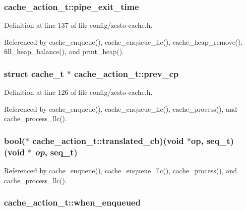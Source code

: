 \subsubsection[{pipe\_\-exit\_\-time}]{ {\bf cache\_\-action\_\-t::pipe\_\-exit\_\-time}}\label{structcache__action__t_0ad77a44844d710fb12f3eae1394da47}




Definition at line 137 of file config/zesto-cache.h.

Referenced by cache\_\-enqueue(), cache\_\-enqueue\_\-llc(), cache\_\-heap\_\-remove(), fill\_\-heap\_\-balance(), and print\_\-heap().
\subsubsection[{prev\_\-cp}]{\setlength{\rightskip}{0pt plus 5cm}struct {\bf cache\_\-t} $\ast$ {\bf cache\_\-action\_\-t::prev\_\-cp}\hspace{0.3cm}{\tt  [read]}}\label{structcache__action__t_beb9dad9b41f0f911d7b8f9a8a763810}




Definition at line 126 of file config/zesto-cache.h.

Referenced by cache\_\-enqueue(), cache\_\-enqueue\_\-llc(), cache\_\-process(), and cache\_\-process\_\-llc().
\subsubsection[{translated\_\-cb}]{\setlength{\rightskip}{0pt plus 5cm}bool($\ast$ {\bf cache\_\-action\_\-t::translated\_\-cb})(void $\ast${\bf op}, {\bf seq\_\-t}) (void $\ast$ {\em op}, \/  {\bf seq\_\-t})}\label{structcache__action__t_8db850e39ac4b8cf82e780419311e312}




Referenced by cache\_\-enqueue(), cache\_\-enqueue\_\-llc(), cache\_\-process(), and cache\_\-process\_\-llc().
\subsubsection[{when\_\-enqueued}]{ {\bf cache\_\-action\_\-t::when\_\-enqueued}}\label{structcache__action__t_e90659d5234050387417904701ad4921}




